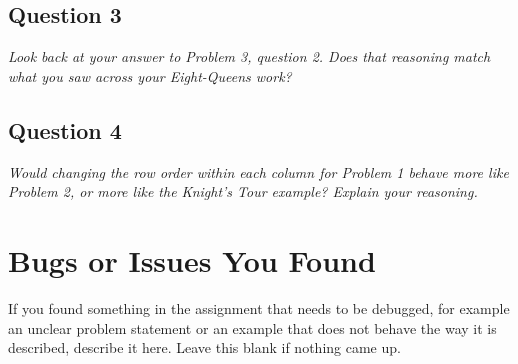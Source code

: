 \documentclass[11pt]{article}
\begin{document}
\vspace{2em}

\subsection{Question 3}
\textit{Look back at your answer to Problem 3, question 2. Does that
reasoning match what you saw across your Eight-Queens work?}

\vspace{2em}

\subsection{Question 4}
\textit{Would changing the row order within each column for Problem 1
behave more like Problem 2, or more like the Knight's Tour example?
Explain your reasoning.}

\section{Bugs or Issues You Found}
If you found something in the assignment that needs to be debugged, for
example an unclear problem statement or an example that does not behave
the way it is described, describe it here. Leave this blank if nothing
came up.

\vspace{3em}
\end{document}
